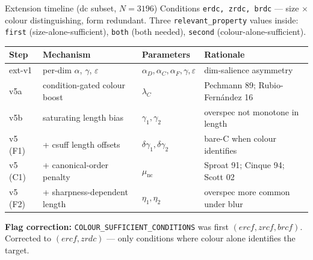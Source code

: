 \documentclass[10pt,aspectratio=169]{beamer}
\begin{document}
\begin{frame}{Extension timeline (dc subset, $N = 3196$)}
\small
Conditions \texttt{erdc, zrdc, brdc} --- size $\times$ colour distinguishing, form redundant.
Three \texttt{relevant\_property} values inside: \texttt{first} (size-alone-sufficient),
\texttt{both} (both needed), \texttt{second} (colour-alone-sufficient).

\vspace{0.8em}
\begin{center}
\renewcommand{\arraystretch}{1.15}
\begin{tabular}{llll}
\toprule
Step & Mechanism & Parameters & Rationale\\
\midrule
ext-v1  & per-dim $\alpha$, $\gamma$, $\varepsilon$           & $\alpha_D,\alpha_C,\alpha_F,\gamma,\varepsilon$ & dim-salience asymmetry \\
v5a     & condition-gated colour boost                       & $\lambda_C$ & Pechmann 89; Rubio-Fern\'andez 16 \\
v5b     & saturating length bias                             & $\gamma_1,\gamma_2$ & overspec not monotone in length \\
v5 (F1) & + csuff length offsets                             & $\delta\gamma_1,\delta\gamma_2$ & bare-C when colour identifies \\
v5 (C1) & + canonical-order penalty                          & $\mu_\mathrm{nc}$ & Sproat 91; Cinque 94; Scott 02 \\
v5 (F2) & + sharpness-dependent length                       & $\eta_1,\eta_2$ & overspec more common under blur \\
\bottomrule
\end{tabular}
\end{center}

\vspace{0.5em}
\textbf{Flag correction:} \texttt{COLOUR\_SUFFICIENT\_CONDITIONS}
was first $(ercf, zrcf, brcf)$. Corrected to $(ercf, zrdc)$ --- only
conditions where colour alone identifies the target.
\end{frame}
\end{document}

